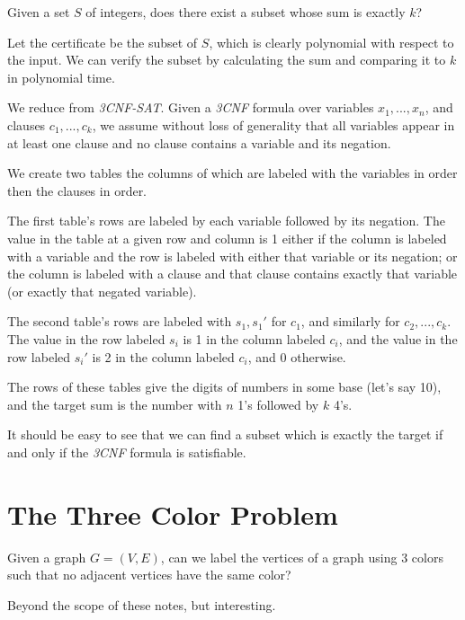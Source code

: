 Given a set $S$ of integers, does there exist a subset whose sum is
exactly $k$?

Let the certificate be the subset of $S$, which is clearly polynomial
with respect to the input.  We can verify the subset by calculating
the sum and comparing it to $k$ in polynomial time.

We reduce from \emph{3CNF-SAT}.  Given a \emph{3CNF} formula over
variables $x_1, ..., x_n$, and clauses $c_1,...,c_k$, we assume
without loss of generality that all variables appear in at least one
clause and no clause contains a variable and its negation.

We create two tables the columns of which are labeled with the
variables in order then the clauses in order.  

The first table's rows are labeled by each variable followed by its
negation.  The value in the table at a given row and column is 1
either if the column is labeled with a variable and the row is labeled
with either that variable or its negation; or the column is labeled
with a clause and that clause contains exactly that variable (or
exactly that negated variable).

The second table's rows are labeled with $s_1,s_1'$ for $c_1$, and
similarly for $c_2,...,c_k$.  The value in the row labeled $s_i$ is 1
in the column labeled $c_i$, and the value in the row labeled $s_i'$
is 2 in the column labeled $c_i$, and 0 otherwise.

The rows of these tables give the digits of numbers in some base
(let's say 10), and the target sum is the number with $n$ 1's followed
by $k$ 4's.

It should be easy to see that we can find a subset which is exactly
the target if and only if the \emph{3CNF} formula is satisfiable.

\section{The Three Color Problem}

Given a graph $G=(V,E)$, can we label the vertices of a graph using 3
colors such that no adjacent vertices have the same color?

Beyond the scope of these notes, but interesting.


